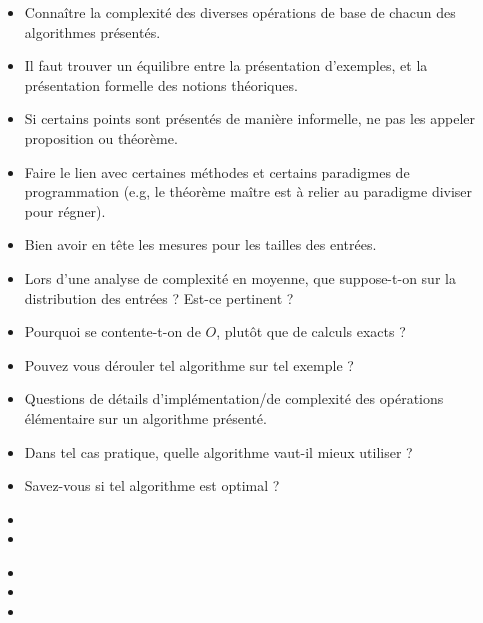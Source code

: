 \documentclass{agregfiche}
\begin{document}
\begin{itemize}
	\item Connaître la complexité des diverses opérations de base de chacun des algorithmes présentés.
    \item Il faut trouver un équilibre entre la présentation d'exemples, et la présentation formelle des notions théoriques.
    \item Si certains points sont présentés de manière informelle, ne pas les appeler proposition ou théorème.
    \item Faire le lien avec certaines méthodes et certains paradigmes
    de programmation (e.g, le théorème maître est à relier au
    paradigme diviser pour régner).
    \item Bien avoir en tête les mesures pour les tailles des entrées.
\end{itemize}

\secquestionsclassiques

\begin{itemize}
	\item Lors d'une analyse de complexité en moyenne, que
	suppose-t-on sur la distribution des entrées ? Est-ce pertinent ?
    \item Pourquoi se contente-t-on de $O$, plutôt que de calculs
    exacts ?
    \item Pouvez vous dérouler tel algorithme sur tel exemple ?
    \item Questions de détails d'implémentation/de complexité des opérations élémentaire sur un algorithme présenté.
    \item Dans tel cas pratique, quelle algorithme vaut-il mieux utiliser ?
    \item Savez-vous si tel algorithme est optimal ?

\end{itemize}

\secreferences

\begin{itemize}
\item 
\item 

\end{itemize}

\secdev

\begin{itemize}
\item 
\item 
\item 
\end{itemize}
\end{document}
